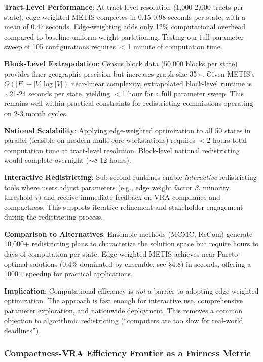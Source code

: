 \textbf{Tract-Level Performance}: At tract-level resolution (1,000-2,000 tracts per state), edge-weighted METIS completes in 0.15-0.98 seconds per state, with a mean of 0.47 seconds. Edge-weighting adds only 12\% computational overhead compared to baseline uniform-weight partitioning. Testing our full parameter sweep of 105 configurations requires $<$1 minute of computation time.

\textbf{Block-Level Extrapolation}: Census block data (50,000 blocks per state) provides finer geographic precision but increases graph size 35×. Given METIS's $O(|E| + |V|\log|V|)$ near-linear complexity, extrapolated block-level runtime is $\sim$21-24 seconds per state, yielding $<$1 hour for a full parameter sweep. This remains well within practical constraints for redistricting commissions operating on 2-3 month cycles.

\textbf{National Scalability}: Applying edge-weighted optimization to all 50 states in parallel (feasible on modern multi-core workstations) requires $<$2 hours total computation time at tract-level resolution. Block-level national redistricting would complete overnight ($\sim$8-12 hours).

\textbf{Interactive Redistricting}: Sub-second runtimes enable \emph{interactive} redistricting tools where users adjust parameters (e.g., edge weight factor $\beta$, minority threshold $\tau$) and receive immediate feedback on VRA compliance and compactness. This supports iterative refinement and stakeholder engagement during the redistricting process.

\textbf{Comparison to Alternatives}: Ensemble methods (MCMC, ReCom) generate 10,000+ redistricting plans to characterize the solution space but require hours to days of computation per state. Edge-weighted METIS achieves near-Pareto-optimal solutions (0.4\% dominated by ensemble, see §4.8) in seconds, offering a 1000× speedup for practical applications.

\textbf{Implication}: Computational efficiency is \emph{not} a barrier to adopting edge-weighted optimization. The approach is fast enough for interactive use, comprehensive parameter exploration, and nationwide deployment. This removes a common objection to algorithmic redistricting (``computers are too slow for real-world deadlines'').

\subsubsection{Compactness-VRA Efficiency Frontier as a Fairness Metric}

